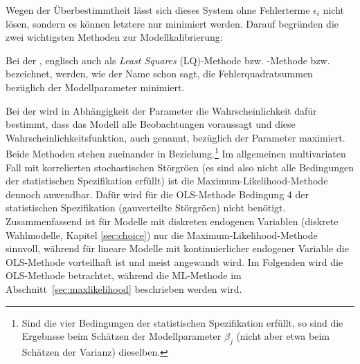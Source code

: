 \noindent
Wegen der \"Uberbestimmtheit l\"asst sich dieses System
ohne Fehlerterme $\epsilon_i$ nicht l\"osen, sondern es k\"onnen
letztere nur minimiert werden. Darauf begr\"unden die zwei
wichtigsten Methoden zur Modellkalibrierung:
\bi
\item
Bei der ,
englisch auch als \textit{Least Squares} (LQ)-Methode
 bzw. -Methode
bzw.  bezeichnet, werden, wie der Name
schon sagt, die Fehlerquadratsummen bez\"uglich der Modellparameter
minimiert. 
\item Bei der  wird 
in Abh\"angigkeit der Parameter die Wahrscheinlichkeit daf\"ur
bestimmt, dass das Modell alle Beobachtungen voraussagt und diese
Wahrscheinlichkeitsfunktion, auch  genannt,
bez\"uglich der Parameter maximiert.
\ei
Beide Methoden stehen zueinander in Beziehung.\footnote{Sind die vier
Bedingungen der statistischen Spezifikation erf\"ullt, so sind die
Ergebnsse beim Sch\"atzen der Modellparameter $\beta_j$  (nicht aber
etwa beim Sch\"atzen  der
Varianz) dieselben.}
Im allgemeinen multivariaten Fall mit
korrelierten stochastischen St\"orgr\"o\3en (es sind also nicht alle
Bedingungen der statistischen Spezifikation erf\"ullt) ist die
Maximum-Likelihood-Methode dennoch anwendbar. Daf\"ur wird f\"ur die
OLS-Methode Bedingung 4 der statistischen Spezifikation
 (gau\3verteilte St\"orgr\"o\3en) nicht
ben\"otigt. Zusammenfassend ist  f\"ur Modelle 
mit diskreten endogenen Variablen (diskrete Wahlmodelle,
Kapitel \ref{sec:choice})
nur die Maximum-Likelihood-Methode sinnvoll, w\"ahrend f\"ur lineare
Modelle mit kontinuierlicher endogener Variable die OLS-Methode
vorteilhaft ist und meist angewandt wird. Im Folgenden wird die
OLS-Methode betrachtet, w\"ahrend die ML-Methode im
Abschnitt~\ref{sec:maxlikelihood} beschrieben werden wird.




